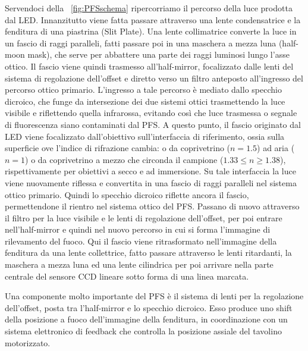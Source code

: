 \begin{itemize}
Servendoci della \figurename~\ref{fig:PFSschema} ripercorriamo il percorso della luce prodotta dal LED. 
Innanzitutto viene fatta passare attraverso una lente condensatrice e la fenditura di una piastrina (Slit Plate).
Una lente collimatrice converte la luce in un fascio di raggi paralleli, fatti passare poi in una maschera a mezza luna (half-moon mask), che serve per abbattere una parte dei raggi luminosi lungo l'asse ottico.
Il fascio viene quindi trasmesso all'half-mirror, focalizzato dalle lenti del sistema di regolazione dell'offset e diretto verso un filtro anteposto all'ingresso del percorso ottico primario. 
L'ingresso a tale percorso è mediato dallo specchio dicroico, che funge da intersezione dei due sistemi ottici trasmettendo la luce visibile e riflettendo quella infrarossa, evitando così che luce trasmessa o segnale di fluorescenza siano contaminati dal PFS. 
A questo punto, il fascio originato dal LED viene focalizzato dall'obiettivo sull'interfaccia di riferimento, ossia sulla superficie ove l'indice di rifrazione cambia: o da coprivetrino ($n=1.5$) ad aria ($n=1$) o da coprivetrino a mezzo che circonda il campione ($1.33\leq n \geq 1.38$), rispettivamente per obiettivi a secco e ad immersione. 
Su tale interfaccia la luce viene nuovamente riflessa e convertita in una fascio di raggi paralleli nel sistema ottico primario. 
Quindi lo specchio dicroico riflette ancora il fascio, permettendone il rientro nel sistema ottico del PFS.
Passano di nuovo attraverso il filtro per la luce visibile e le lenti di regolazione dell'offset, per poi entrare nell'half-mirror e quindi nel nuovo percorso in cui si forma l'immagine di rilevamento del fuoco. 
Qui il fascio viene ritrasformato nell'immagine della fenditura da una lente collettrice, fatto passare attraverso le lenti ritardanti, la maschera a mezza luna ed una lente cilindrica per poi arrivare nella parte centrale del sensore CCD lineare sotto forma di una linea marcata.

Una componente molto importante del PFS è il sistema di lenti per la regolazione dell'offset, posta tra l'half-mirror e lo specchio dicroico.
Esso produce uno shift della posizione a fuoco dell'immagine della fenditura, in coordinazione con un sistema elettronico di feedback che controlla la posizione assiale del tavolino motorizzato. 


\end{itemize}
